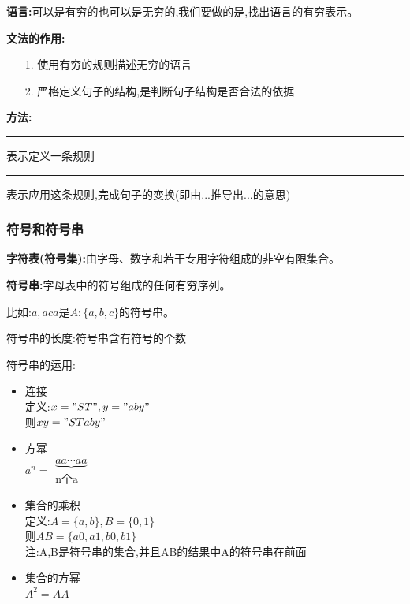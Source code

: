 \documentclass[UTF8,a4paper]{ctexart}
\newcommand\hl{\bgroup\markoverwith
  {\textcolor[rgb]{0.9, 0.99, 0.9}{\rule[-.5ex]{2pt}{2.5ex}}}\ULon}
\newcommand{\spaceline}{\vspace{\baselineskip}}
\begin{document}
    \spaceline
    \textbf{语言:}可以是有穷的也可以是无穷的,我们要做的是,找出语言的有穷表示。

    \textbf{文法的作用:}
    \begin{itemize}
      \item [1.] 使用有穷的规则描述无穷的语言
      \item [2.] 严格定义句子的结构,是判断句子结构是否合法的依据
    \end{itemize}

    \textbf{方法:}\\
    \hl{::=}表示定义一条规则\\
    \hl{$\Rightarrow$}表示应用这条规则,完成句子的变换(即由...推导出...的意思)

      \subsubsection{符号和符号串}
      \textbf{字符表(符号集):}由字母、数字和若干专用字符组成的非空有限集合。

      \textbf{符号串:}字母表中的符号组成的任何有穷序列。

      比如:$a,aca$是$A:\{a,b,c\}$的符号串。

      符号串的长度:符号串含有符号的个数

      符号串的运用:
      \begin{itemize}
        \item 连接\\
        定义:$x = "ST", y = "aby"$\\
        则$xy = "STaby"$

        \item 方幂\\
        $a^n = \begin{array}{c}\underbrace{aa\cdots aa}\\ \text{n个a} \end{array}$

        \item 集合的乘积\\
        定义:$A = \{a,b\} , B = \{0 ,1\}$\\
        则$AB = \{a0 , a1 , b0 , b1\}$\\
        注:A,B是符号串的集合,并且AB的结果中A的符号串在前面\\

        \item 集合的方幂\\
        $A^2 = AA$
      \end{itemize}
\end{document}
